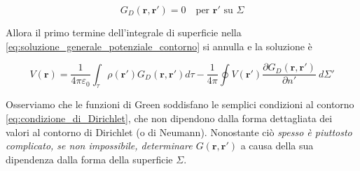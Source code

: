 \begin{equation}
    G_D(\mathbf{r}, \mathbf{r'}) = 0 \quad \text{per $\mathbf{r'}$ su $\Sigma$}
    \label{eq:condizione_di_Dirichlet}
\end{equation}

Allora il primo termine dell'integrale di superficie nella \ref{eq:soluzione_generale_potenziale_contorno} si annulla e la soluzione è 

\begin{tcolorbox}[colback=yellow!10!white, colframe=orange!70!black, boxrule=0.8pt]
\begin{equation}
    V(\mathbf{r}) = \frac{1}{4 \pi \varepsilon_{0}} \int_{\tau} \rho(\mathbf{r'}) G_D(\mathbf{r}, \mathbf{r'}) d \tau - \frac{1}{4 \pi} \oint V(\mathbf{r'}) \frac{\partial G_D(\mathbf{r}, \mathbf{r'})}{\partial n'} \ d \Sigma'
\end{equation}
\end{tcolorbox}

Osserviamo che le funzioni di Green soddisfano le semplici condizioni al contorno \ref{eq:condizione_di_Dirichlet}, che non dipendono dalla forma dettagliata dei valori al contorno di Dirichlet (o di Neumann). Nonostante ciò \emph{spesso è piuttosto complicato, se non impossibile, determinare $G(\mathbf{r}, \mathbf{r'})$} a causa della sua dipendenza dalla forma della superficie $\Sigma$. 

\newpage




